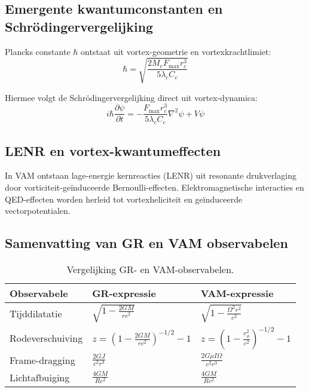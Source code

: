 \subsection*{Emergente kwantumconstanten en Schrödingervergelijking}

Plancks constante $\hbar$ ontstaat uit vortex-geometrie en vortexkrachtlimiet:
\[
\hbar = \sqrt{\frac{2M_e F_{\max} r_c^3}{5 \lambda_c C_e}}
\]

Hiermee volgt de Schrödingervergelijking direct uit vortex-dynamica:
\[
i \hbar \frac{\partial \psi}{\partial t} = -\frac{F_{\max} r_c^3}{5 \lambda_c C_e}\nabla^2 \psi + V\psi
\]

\subsection*{LENR en vortex-kwantumeffecten}

In VAM ontstaan lage-energie kernreacties (LENR) uit resonante drukverlaging door vorticiteit-geïnduceerde Bernoulli-effecten. Elektromagnetische interacties en QED-effecten worden herleid tot vortexheliciteit en geïnduceerde vectorpotentialen.

\subsection*{Samenvatting van GR en VAM observabelen}

\begin{table}[h!]
    \centering
    \begin{tabular}{lll}
        \toprule
        \textbf{Observabele} & \textbf{GR-expressie} & \textbf{VAM-expressie} \\
        \midrule
        Tijddilatatie & $\sqrt{1-\frac{2GM}{rc^2}}$ & $\sqrt{1-\frac{\Omega^2 r^2}{c^2}}$\\[0.5em]
        Rodeverschuiving & $z=\left(1-\frac{2GM}{rc^2}\right)^{-1/2}-1$ & $z=\left(1-\frac{v_\phi^2}{c^2}\right)^{-1/2}-1$\\[0.5em]
        Frame-dragging & $\frac{2GJ}{c^2 r^3}$ & $\frac{2G\mu I\Omega}{c^2 r^3}$\\[0.5em]
        Lichtafbuiging & $\frac{4GM}{Rc^2}$ & $\frac{4GM}{Rc^2}$\\
        \bottomrule
    \end{tabular}
    \caption{Vergelijking GR- en VAM-observabelen.}
    \label{tab:vergelijkingen}
\end{table}




